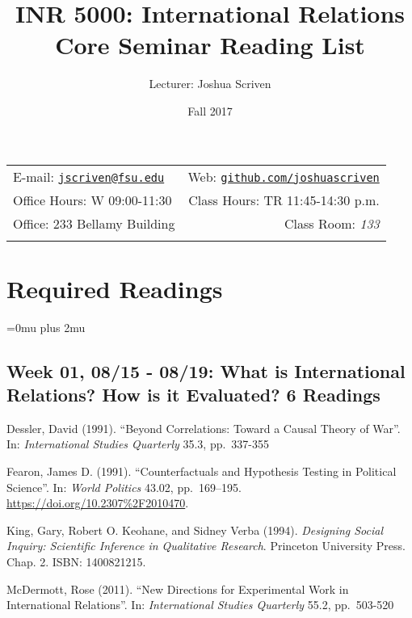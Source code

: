 \documentclass[10pt,]{article}
\title{INR 5000: International Relations Core Seminar \textbar{} Reading List}
\author{Lecturer: Joshua Scriven}
\date{Fall 2017}
\begin{document}
		\maketitle
	

		\thispagestyle{firststyle}



	\noindent \begin{tabular*}{\textwidth}{ @{\extracolsep{\fill}} lr @{\extracolsep{\fill}}}


E-mail: \texttt{\href{mailto:jscriven@fsu.edu}{\nolinkurl{jscriven@fsu.edu}}} & Web: \href{http://github.com/joshuascriven}{\tt github.com/joshuascriven}\\
Office Hours: W 09:00-11:30  &  Class Hours: TR 11:45-14:30 p.m.\\
Office: 233 Bellamy Building  & Class Room: \emph{133}\\
	&  \\
	\hline
	\end{tabular*}

\vspace{2mm}



\section{Required Readings}\label{required-readings}

\Urlmuskip=0mu plus 2mu

\subsection{Week 01, 08/15 - 08/19: What is International Relations? How
is it Evaluated? \textbar{} 6
Readings}\label{week-01-0815---0819-what-is-international-relations-how-is-it-evaluated-6-readings}

Dessler, David (1991). ``Beyond Correlations: Toward a Causal Theory of
War''. In: \emph{International Studies Quarterly} 35.3, pp.~337-355

Fearon, James D. (1991). ``Counterfactuals and Hypothesis Testing in
Political Science''. In: \emph{World Politics} 43.02, pp.~169--195.
\url{https://doi.org/10.2307\%2F2010470}.

King, Gary, Robert O. Keohane, and Sidney Verba (1994).
\emph{Designing Social Inquiry: Scientific Inference in Qualitative Research}.
Princeton University Press. Chap. 2. ISBN: 1400821215.

McDermott, Rose (2011). ``New Directions for Experimental Work in
International Relations''. In: \emph{International Studies Quarterly}
55.2, pp.~503-520
\end{document}
